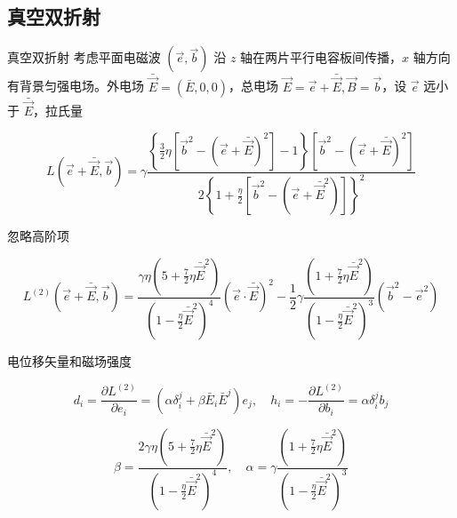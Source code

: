 \documentclass[9pt, dvipsnames]{beamer} %
\begin{document}
\subsection{真空双折射}

\begin{frame}{真空双折射}
        考虑平面电磁波 $(\vec{e},\vec{b}) $ 沿 $z $ 轴在两片平行电容板间传播，$x $ 轴方向有背景匀强电场。外电场 $\bar{\vec{E}}=(\bar{E},0,0) $，总电场 $\vec{E}=\vec{e}+\bar{\vec{E}},\vec{B}=\vec{b} $，设 $\vec{e} $ 远小于 $\bar{\vec{E}} $，拉氏量

    $$
    L\left(\vec{e}+\bar{\vec{E}},\vec{b} \right)
    =\gamma\frac{\left\{\frac{3 }{2 } \eta\left[\vec{b}^2-\left(\vec{e}+\bar{\vec{E}} \right)^2 \right] - 1 \right\}\left[\vec{b}^2-\left(\vec{e}+\bar{\vec{E}} \right)^2 \right] }{2\left\{1+\frac{\eta }{2 } \left[\vec{b}^2-\left(\vec{e} + \bar{\vec{E}}^2 \right) \right] \right\}^2 } 
    $$
    
    忽略高阶项
    
    $$
    L^{(2)}\left(\vec{e}+\bar{\vec{E}},\vec{b}\right)
    =\frac{\gamma\eta\left(5+\frac{7 }{2 } \eta \bar{\vec{E}}^2 \right) }{\left(1-\frac{\eta }{2 } \bar{\vec{E}}^2 \right)^4 }\left(\vec{e}\cdot\bar{\vec{E}} \right)^2 - \frac{1 }{2 } \gamma \frac{\left(1+\frac{7 }{2 } \eta \bar{\vec{E}}^2 \right) }{\left(1-\frac{\eta }{2 } \bar{\vec{E}}^2 \right)^3 }\left(\vec{b}^2-\vec{e}^2 \right) 
    $$
    
    电位移矢量和磁场强度
    
    $$
    d_i = \frac{\partial L^{(2)} }{\partial e_i } = \left(\alpha\delta_i^j+\beta\bar{E}_i\bar{E}^j \right)e_j,\quad
    h_i
    =-\frac{\partial L^{(2)} }{\partial b_i } 
    =\alpha\delta_i^j b_j 
    $$

    $$
    \beta = \frac{2\gamma \eta\left(5+\frac{7 }{2 } \eta \bar{\vec{E}}^2 \right) }{\left(1-\frac{\eta }{2 } \bar{\vec{E}}^2 \right)^4 },\quad 
    \alpha = \gamma \frac{\left(1+\frac{7 }{2 }\eta\bar{\vec{E}}^2 \right)  }{\left(1-\frac{\eta }{2 } \bar{\vec{E}}^2 \right)^3 }
    $$
\end{frame}
\end{document}
